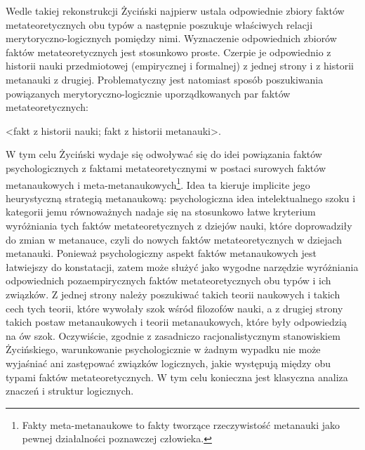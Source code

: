 \documentclass{article}
\begin{document}
Wedle takiej rekonstrukcji Życiński najpierw ustala odpowiednie zbiory faktów metateoretycznych obu typów a następnie
poszukuje właściwych relacji merytoryczno-logicznych pomiędzy nimi. Wyznaczenie odpowiednich zbiorów faktów
metateoretycznych jest stosunkowo proste. Czerpie je odpowiednio z historii nauki przedmiotowej (empirycznej i
formalnej) z jednej strony i z historii metanauki z drugiej. Problematyczny jest natomiast sposób poszukiwania
powiązanych merytoryczno-logicznie uporządkowanych par faktów metateoretycznych: 

{\textless}fakt z historii nauki; fakt z historii metanauki{\textgreater}. 

W tym celu Życiński wydaje się odwoływać się do idei powiązania faktów psychologicznych z faktami metateoretycznymi w
postaci surowych faktów metanaukowych i meta-metanaukowych\footnote{Fakty meta-metanaukowe to fakty tworzące
rzeczywistość metanauki jako pewnej działalności poznawczej człowieka.}. Idea ta kieruje implicite jego heurystyczną
strategią metanaukową: psychologiczna idea intelektualnego szoku i kategorii jemu równoważnych nadaje się na stosunkowo
łatwe kryterium wyróżniania tych faktów metateoretycznych z dziejów nauki, które doprowadziły do zmian w metanauce,
czyli do nowych faktów metateoretycznych w dziejach metanauki. Ponieważ psychologiczny aspekt faktów metanaukowych jest
łatwiejszy do konstatacji, zatem może służyć jako wygodne narzędzie wyróżniania odpowiednich pozaempirycznych faktów
metateoretycznych obu typów i ich związków. Z jednej strony należy poszukiwać takich teorii naukowych i takich cech
tych teorii, które wywołały szok wśród filozofów nauki, a z drugiej strony takich postaw metanaukowych i teorii
metanaukowych, które były odpowiedzią na ów szok. Oczywiście, zgodnie z zasadniczo racjonalistycznym stanowiskiem
Życińskiego, warunkowanie psychologicznie w żadnym wypadku nie może wyjaśniać ani zastępować związków logicznych, jakie
występują między obu typami faktów metateoretycznych. W tym celu konieczna jest klasyczna analiza znaczeń i struktur
logicznych.
\end{document}

